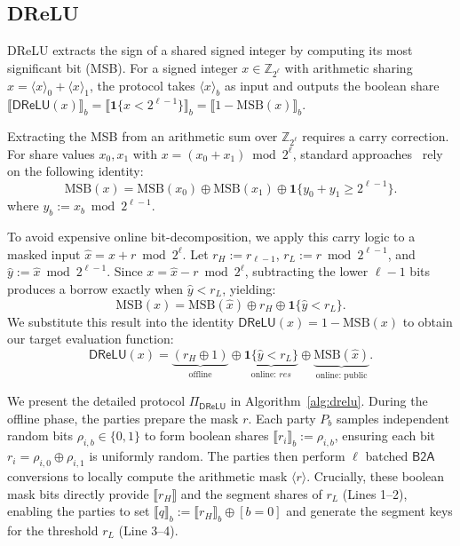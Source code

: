 \documentclass[journal]{IEEEtran}
\theoremstyle{definition}
\theoremstyle{plain}
\newcommand{\Z}{\mathbb{Z}}
\newcommand{\ashare}[1]{\langle #1 \rangle}             %
\newcommand{\bshare}[1]{\llbracket #1 \rrbracket}        %
\newcommand{\DReLU}{\mathsf{DReLU}}
\newcommand{\ind}[1]{\mathbf{1}\{#1\}}
\begin{document}
\subsection{DReLU}\label{sec:Drelu}
DReLU extracts the sign of a shared signed integer by computing its most significant
bit (MSB). For a signed integer $x \in \Z_{2^\ell}$ with arithmetic sharing
$x=\ashare{x}_0+\ashare{x}_1$, the protocol takes $\ashare{x}_b$ as input and
outputs the boolean share
$\bshare{\DReLU(x)}_b=\bshare{\ind{x<2^{\ell-1}}}_b
=\bshare{1-\mathrm{MSB}(x)}_b$.

Extracting the MSB from an arithmetic sum over $\Z_{2^\ell}$ requires a carry correction. 
For share values $x_0,x_1$ with $x=(x_0+x_1)\bmod 2^\ell$, 
standard approaches~\cite{cryptflow2,sigma,falcon} rely on the following identity:
\begin{equation}
  \label{eq:MSB}
  \mathrm{MSB}(x)=\mathrm{MSB}(x_0)\oplus\mathrm{MSB}(x_1)
  \oplus\ind{y_0+y_1\ge 2^{\ell-1}}.
\end{equation}
where $y_b:=x_b\bmod 2^{\ell-1}$.

To avoid expensive online bit-decomposition, we apply this 
carry logic to a masked input $\hat{x}=x+r\bmod 2^\ell$. 
Let $r_H:=r_{\ell-1}$, $r_L:=r\bmod 2^{\ell-1}$, and 
$\hat{y}:=\hat{x}\bmod 2^{\ell-1}$. Since $x=\hat{x}-r\bmod 2^\ell$, 
subtracting the lower $\ell-1$ bits produces a borrow exactly 
when $\hat{y}<r_L$, yielding:
\begin{equation}
\label{eq:MSB_last}
\mathrm{MSB}(x)=\mathrm{MSB}(\hat{x})\oplus r_H\oplus\ind{\hat{y}<r_L}.
\end{equation}
We substitute this result into the 
identity $\DReLU(x)=1-\mathrm{MSB}(x)$ to obtain our target evaluation function:
\begin{equation}
  \label{eq:drelu-fold}
  \DReLU(x)=\underbrace{(r_H\oplus1)}_{\text{offline}}
  \oplus \underbrace{\ind{\hat{y}<r_L}}_{\text{online: }\mathit{res}} 
  \oplus \underbrace{\mathrm{MSB}(\hat{x})}_{\text{online: public}}.
\end{equation}

We present the detailed protocol $\Pi_{\DReLU}$ in Algorithm~\ref{alg:drelu}.
During the offline phase, the parties prepare the mask $r$. Each party $P_b$ 
samples independent random bits $\rho_{i,b} \in \{0,1\}$ to form boolean 
shares $\bshare{r_i}_b:=\rho_{i,b}$, ensuring each 
bit $r_i=\rho_{i,0}\oplus\rho_{i,1}$ is uniformly random. 
The parties then perform $\ell$ batched $\mathsf{B2A}$ conversions 
to locally compute the arithmetic mask $\ashare{r}$.
Crucially, these boolean mask bits directly provide $\bshare{r_H}$ and 
the segment shares of $r_L$ (Lines 1--2), enabling the parties 
to set $\bshare{q}_b:=\bshare{r_H}_b\oplus[b{=}0]$ and 
generate the segment keys for the threshold $r_L$ (Line 3--4).
\end{document}

